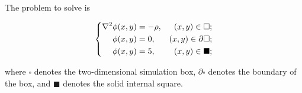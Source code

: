 \Answer{}
The problem to solve is
%
\begin{spreadlines}{2ex} %
    \begin{equation}
        \begin{dcases}
            \begin{aligned}
                \nabla^2 \phi(x, y) & = -\rho, & (x, y) \in \square;         \\
                \phi(x, y)          & = 0,     & (x, y) \in \partial\square; \\
                \phi(x, y)          & = 5,     & (x, y) \in \blacksquare;
            \end{aligned}
        \end{dcases}
    \end{equation}
\end{spreadlines}
%
where \(\square\) denotes the two-dimensional simulation box,
\(\partial\square\) denotes the boundary of the box,
and \(\blacksquare\) denotes the solid internal square.

% 

